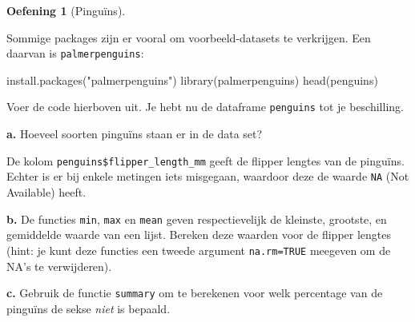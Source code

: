\documentclass[
  a4paper,
]{scrbook}
\newenvironment{Shaded}{\begin{snugshade}}{\end{snugshade}}
\newcommand{\FunctionTok}[1]{\textcolor[rgb]{0.28,0.35,0.67}{#1}}
\newcommand{\NormalTok}[1]{\textcolor[rgb]{0.00,0.23,0.31}{#1}}
\newcommand{\StringTok}[1]{\textcolor[rgb]{0.13,0.47,0.30}{#1}}
\theoremstyle{definition}
\newtheorem{exercise}{Oefening}[chapter]
\theoremstyle{remark}
\begin{document}
\begin{exercise}[Pinguïns]\protect\hypertarget{exr-penguins}{}\label{exr-penguins}

Sommige packages zijn er vooral om voorbeeld-datasets te verkrijgen. Een
daarvan is \texttt{palmerpenguins}:

\begin{Shaded}
\begin{Highlighting}[]
\FunctionTok{install.packages}\NormalTok{(}\StringTok{"palmerpenguins"}\NormalTok{)}
\FunctionTok{library}\NormalTok{(palmerpenguins)}
\FunctionTok{head}\NormalTok{(penguins)}
\end{Highlighting}
\end{Shaded}

Voer de code hierboven uit. Je hebt nu de dataframe \texttt{penguins}
tot je beschilling.

\textbf{a.} Hoeveel soorten pinguïns staan er in de data set?

De kolom \texttt{penguins\$flipper\_length\_mm} geeft de flipper lengtes
van de pinguïns. Echter is er bij enkele metingen iets misgegaan,
waardoor deze de waarde \texttt{NA} (Not Available) heeft.

\textbf{b.} De functies \texttt{min}, \texttt{max} en \texttt{mean}
geven respectievelijk de kleinste, grootste, en gemiddelde waarde van
een lijst. Bereken deze waarden voor de flipper lengtes (hint: je kunt
deze functies een tweede argument \texttt{na.rm=TRUE} meegeven om de
NA's te verwijderen).

\textbf{c.} Gebruik de functie \texttt{summary} om te berekenen voor
welk percentage van de pinguïns de sekse \emph{niet} is bepaald.

\end{exercise}
\end{document}
